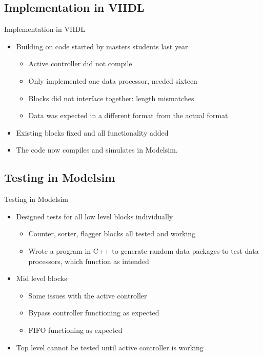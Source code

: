 \documentclass{beamer}
\begin{document}
\subsection{Implementation in VHDL}

\begin{frame}{Implementation in VHDL}
  \begin{itemize}
    \item
      Building on code started by masters students last year
      \begin{itemize}
        \item
          Active controller did not compile
        \item
          Only implemented one data processor, needed sixteen
        \item
          Blocks did not interface together: length mismatches
        \item
          Data was expected in a different format from the actual format
      \end{itemize}
    \item
      Existing blocks fixed and all functionality added
    \item
      The code now compiles and simulates in Modelsim.
    \end{itemize}
\end{frame}


\subsection{Testing in Modelsim}

\begin{frame}{Testing in Modelsim}
  \begin{itemize}
    \item
      Designed tests for all low level blocks individually
      \begin{itemize}
        \item
          Counter, sorter, flagger blocks all tested and working
        \item
          Wrote a program in C++ to generate random data packages to test data processors, which function as intended
      \end{itemize}
    \item
      Mid level blocks
      \begin{itemize}
        \item
          Some issues with the active controller
        \item
          Bypass controller functioning as expected
        \item
          FIFO functioning as expected
      \end{itemize}
    \item
      Top level cannot be tested until active controller is working
  \end{itemize}
\end{frame}
\end{document}
